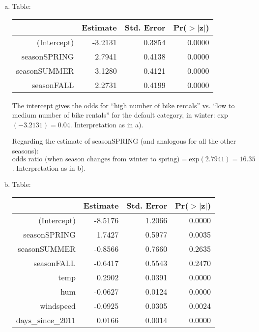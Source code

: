 {\begin{enumerate}[a)]
    and for fall:
    \[
    \text{odds ratio} 
    = \frac{P(y=1\, | \,\texttt{season}=\text{FALL})\,/\,P(y=0\, | \,\texttt{season}=\text{FALL})}{P(y=1\, | \,\texttt{season}=\text{WINTER})\,/\,P(y=0\, | \,\texttt{season}=\text{WINTER})}
    = \frac{50/128}{7/174} = 9.71.
    \]
    
	\textbf{Interpretation:} The chances (the odds) of having "high bike rentals" are $16.35$ times higher in season SPRING compared to the reference category (WINTER).
    As in winter the odds of $y=0$ are $25:1$, this means in spring they are roughly $(25:16):1$, which means roughly $5:3$.
    Similarly, in summer the odds are $22.83$ times higher that in winter, which means that in summer they are close to $1:1$ (since in winter they were $1:25$), so the chances in summer are roughly 50-50.

    \newpage
    
	\item Table:
	\begin{table}[!ht]
		\centering
		\begin{tabular}{rrrr}
			\hline
			& Estimate & Std. Error & Pr($>$$|$z$|$) \\ 
			\hline
			(Intercept) & -3.2131 & 0.3854 & 0.0000 \\ 
			seasonSPRING & 2.7941 & 0.4138 & 0.0000 \\ 
			seasonSUMMER & 3.1280 & 0.4121 & 0.0000 \\ 
			seasonFALL & 2.2731 & 0.4199 & 0.0000 \\ 
			\hline
		\end{tabular}
	\end{table}

	The intercept gives the odds for ``high number of bike rentals'' vs. ``low to medium number of bike rentals'' for the default category, in winter: exp$(-3.2131) = 0.04$. Interpretation as in a).
	
	Regarding the estimate of seasonSPRING (and analogous for all the other seasons): $\text{odds ratio (when season changes from winter to spring)} = \text{exp}(2.7941) =  16.35$. Interpretation as in b).
    
	\item Table:	
	\begin{table}[ht]
		\centering
		\begin{tabular}{rrrr}
			\hline
			& Estimate & Std. Error & Pr($>$$|$z$|$) \\ 
			\hline
			(Intercept) & -8.5176 & 1.2066 & 0.0000 \\ 
			seasonSPRING & 1.7427 & 0.5977 & 0.0035 \\ 
			seasonSUMMER & -0.8566 & 0.7660 & 0.2635 \\ 
			seasonFALL & -0.6417 & 0.5543 & 0.2470 \\ 
			temp & 0.2902 & 0.0391 & 0.0000 \\ 
			hum & -0.0627 & 0.0124 & 0.0000 \\ 
			windspeed & -0.0925 & 0.0305 & 0.0024 \\ 
			days\_since\_2011 & 0.0166 & 0.0014 & 0.0000 \\ 
			\hline
		\end{tabular}
	\end{table}
	

\end{enumerate}}
